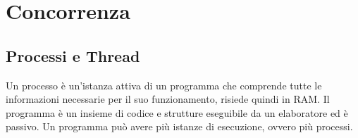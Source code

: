 \documentclass[a4paper]{article}
\begin{document}


\section{Concorrenza}
\subsection{Processi e Thread}
Un processo è un'istanza attiva di un programma che comprende tutte le informazioni necessarie per il suo funzionamento, risiede
quindi in RAM. Il programma è un insieme di codice e strutture eseguibile da un elaboratore ed è passivo. Un programma può avere
più istanze di esecuzione, ovvero più processi.
\end{document}
